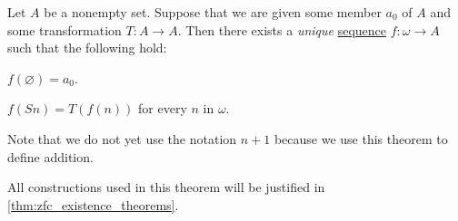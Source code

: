 \begin{theorem}\label{thm:omega_recursion}
  Let \( A \) be a nonempty set. Suppose that we are given some member \( a_0 \) of \( A \) and some transformation \( T: A \to A \). Then there exists a \emph{unique} \hyperref[def:sequence]{sequence} \( f: \omega \to A \) such that the following hold:

  \begin{thmenum}
     \( f(\varnothing) = a_0 \).

     \( f(Sn) = T(f(n)) \) for every \( n \) in \( \omega \).
  \end{thmenum}
\end{theorem}
\begin{comments}
  \item Note that we do not yet use the notation \( n + 1 \) because we use this theorem to define addition.
  \item All constructions used in this theorem will be justified in \cref{thm:zfc_existence_theorems}.
\end{comments}
